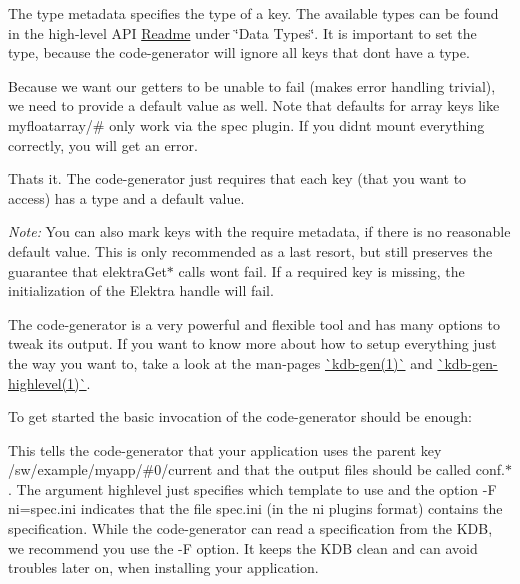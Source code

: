 The {\ttfamily type} metadata specifies the type of a key. The available types can be found in the high-\/level A\+PI \mbox{\hyperlink{src_libs_highlevel_README_md}{Readme}} under \char`\"{}\+Data Types\char`\"{}. It is important to set the {\ttfamily type}, because the code-\/generator will ignore all keys that don\textquotesingle{}t have a {\ttfamily type}.

Because we want our getters to be unable to fail (makes error handling trivial), we need to provide a {\ttfamily default} value as well. Note that {\ttfamily default}s for array keys like {\ttfamily myfloatarray/\#} only work via the {\ttfamily spec} plugin. If you didn\textquotesingle{}t mount everything correctly, you will get an error.

That\textquotesingle{}s it. The code-\/generator just requires that each key (that you want to access) has a {\ttfamily type} and a {\ttfamily default} value.

{\itshape Note\+:} You can also mark keys with the {\ttfamily require} metadata, if there is no reasonable default value. This is only recommended as a last resort, but still preserves the guarantee that {\ttfamily elektra\+Get$\ast$} calls won\textquotesingle{}t fail. If a {\ttfamily require}d key is missing, the initialization of the {\ttfamily Elektra} handle will fail.

The code-\/generator is a very powerful and flexible tool and has many options to tweak its output. If you want to know more about how to setup everything just the way you want to, take a look at the man-\/pages \mbox{\hyperlink{doc_help_kdb-gen_md}{\`{}kdb-\/gen(1)\`{}}} and \mbox{\hyperlink{doc_help_kdb-gen-highlevel_md}{\`{}kdb-\/gen-\/highlevel(1)\`{}}}.

To get started the basic invocation of the code-\/generator should be enough\+:


\begin{DoxyCode}{0}
\end{DoxyCode}


This tells the code-\/generator that your application uses the parent key {\ttfamily /sw/example/myapp/\#0/current} and that the output files should be called {\ttfamily conf.$\ast$}. The argument {\ttfamily highlevel} just specifies which template to use and the option {\ttfamily -\/F ni=spec.\+ini} indicates that the file {\ttfamily spec.\+ini} (in the {\ttfamily ni} plugin\textquotesingle{}s format) contains the specification. While the code-\/generator can read a specification from the K\+DB, we recommend you use the {\ttfamily -\/F} option. It keeps the K\+DB clean and can avoid troubles later on, when installing your application.

